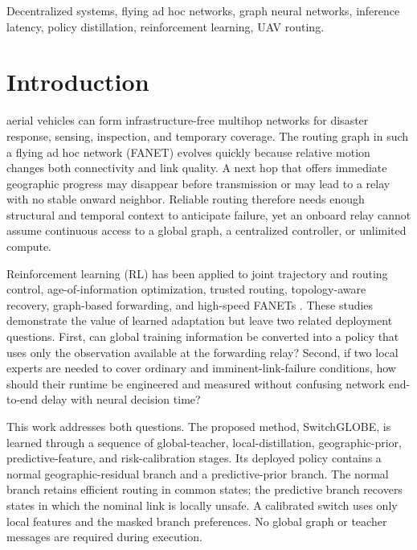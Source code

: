 \documentclass{ieeeaccess}
\newcommand{\SG}{SwitchGLOBE}
\begin{document}
\begin{keywords}
Decentralized systems, flying ad hoc networks, graph neural networks, inference latency, policy distillation, reinforcement learning, UAV routing.
\end{keywords}

\titlepgskip=-21pt
\maketitle

\section{Introduction}

 aerial vehicles can form infrastructure-free multihop networks for disaster response, sensing, inspection, and temporary coverage. The routing graph in such a flying ad hoc network (FANET) evolves quickly because relative motion changes both connectivity and link quality. A next hop that offers immediate geographic progress may disappear before transmission or may lead to a relay with no stable onward neighbor. Reliable routing therefore needs enough structural and temporal context to anticipate failure, yet an onboard relay cannot assume continuous access to a global graph, a centralized controller, or unlimited compute.

Reinforcement learning (RL) has been applied to joint trajectory and routing control, age-of-information optimization, trusted routing, topology-aware recovery, graph-based forwarding, and high-speed FANETs \cite{alam2024joint,wu2026aoi,jia2025trusted,cui2022tarraq,zhang2025gat,shou2026adaptive}. These studies demonstrate the value of learned adaptation but leave two related deployment questions. First, can global training information be converted into a policy that uses only the observation available at the forwarding relay? Second, if two local experts are needed to cover ordinary and imminent-link-failure conditions, how should their runtime be engineered and measured without confusing network end-to-end delay with neural decision time?

This work addresses both questions. The proposed method, \SG{}, is learned through a sequence of global-teacher, local-distillation, geographic-prior, predictive-feature, and risk-calibration stages. Its deployed policy contains a normal geographic-residual branch and a predictive-prior branch. The normal branch retains efficient routing in common states; the predictive branch recovers states in which the nominal link is locally unsafe. A calibrated switch uses only local features and the masked branch preferences. No global graph or teacher messages are required during execution.
\end{document}
